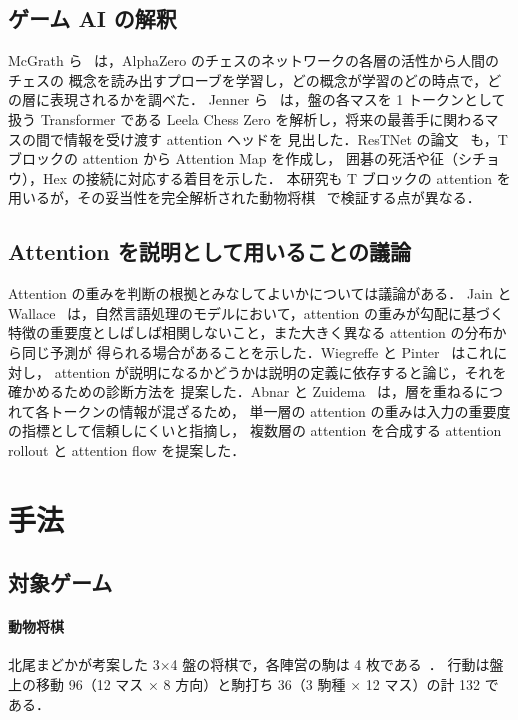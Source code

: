 \documentclass[a4paper,10pt,twocolumn]{ltjsarticle}
\begin{document}
\subsection{ゲーム AI の解釈}
McGrath ら~\cite{mcgrath} は，AlphaZero のチェスのネットワークの各層の活性から人間のチェスの
概念を読み出すプローブを学習し，どの概念が学習のどの時点で，どの層に表現されるかを調べた．
Jenner ら~\cite{jenner} は，盤の各マスを 1 トークンとして扱う Transformer である
Leela Chess Zero を解析し，将来の最善手に関わるマスの間で情報を受け渡す attention ヘッドを
見出した．ResTNet の論文~\cite{restnet} も，T ブロックの attention から Attention Map を作成し，
囲碁の死活や征（シチョウ），Hex の接続に対応する着目を示した．
本研究も T ブロックの attention を用いるが，その妥当性を完全解析された動物将棋~\cite{tanaka2009}
で検証する点が異なる．

\subsection{Attention を説明として用いることの議論}
Attention の重みを判断の根拠とみなしてよいかについては議論がある．
Jain と Wallace~\cite{jain} は，自然言語処理のモデルにおいて，attention の重みが勾配に基づく
特徴の重要度としばしば相関しないこと，また大きく異なる attention の分布から同じ予測が
得られる場合があることを示した．Wiegreffe と Pinter~\cite{wiegreffe} はこれに対し，
attention が説明になるかどうかは説明の定義に依存すると論じ，それを確かめるための診断方法を
提案した．Abnar と Zuidema~\cite{abnar} は，層を重ねるにつれて各トークンの情報が混ざるため，
単一層の attention の重みは入力の重要度の指標として信頼しにくいと指摘し，
複数層の attention を合成する attention rollout と attention flow を提案した．

\section{手法}
\subsection{対象ゲーム}
\paragraph{動物将棋}
北尾まどかが考案した 3×4 盤の将棋で，各陣営の駒は 4 枚である~\cite{tanaka2009}．
行動は盤上の移動 96（12 マス × 8 方向）と駒打ち 36（3 駒種 × 12 マス）の計 132 である．
\end{document}
